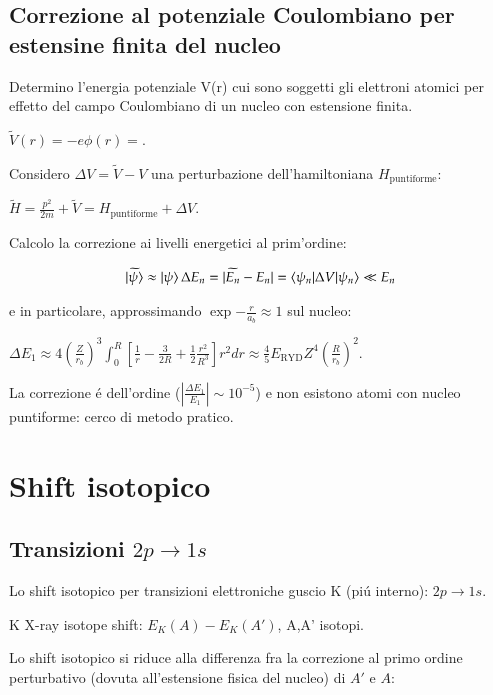 \documentclass[main.tex]{subfiles}
\begin{document}
\subsection{Correzione al potenziale Coulombiano per estensine finita del nucleo}

Determino l'energia potenziale V(r) cui sono soggetti gli elettroni atomici per effetto del campo Coulombiano di un nucleo con estensione finita.

$\widetilde{V}(r)=-e\phi(r)=$.

Considero $\Delta V=\widetilde{V}-V$ una perturbazione dell'hamiltoniana $H_{\text{puntiforme}}$:

$\widetilde{H}=\frac{p^2}{2m}+\widetilde{V}=H_{\text{puntiforme}}+\Delta V$.

Calcolo la correzione ai livelli energetici al prim'ordine:

\begin{align*}
\ket{\widetilde{\psi}}\approx\ket{\psi}
\Delta E_n=|\widetilde{E_n}-E_n|=\braket{\psi_n|\Delta V|\psi_n}\ll E_n
\end{align*}

e in particolare, approssimando $\exp{-\frac{r}{a_b}}\approx1$ sul nucleo:

$\Delta E_1\approx4(\frac{Z}{r_b})^3\int_0^R[\frac{1}{r}-\frac{3}{2R}+\frac{1}{2}\frac{r^2}{R^3}]r^2dr\approx \frac{4}{5}E_{\text{RYD}}Z^4(\frac{R}{r_b})^2$.

La correzione \'e dell'ordine ($|\frac{\Delta E_1}{E_1}|\sim10^{-5}$) e non esistono atomi con nucleo puntiforme: cerco di metodo pratico.

\section{Shift isotopico}

\subsection{Transizioni $2p\rightarrow1s$}

Lo shift isotopico per transizioni elettroniche guscio K (pi\'u interno): $2p\rightarrow1s$.

K X-ray isotope shift: $E_K(A)-E_K(A')$, A,A' isotopi.

Lo shift isotopico si riduce alla differenza fra la correzione al primo ordine perturbativo (dovuta all'estensione fisica del nucleo) di $A'$ e $A$:
\end{document}
